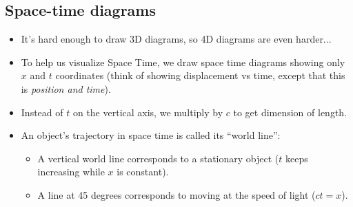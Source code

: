 \documentclass[aspectratio=169,
hyperref={colorlinks,urlcolor=blue}
]{beamer}
\begin{document}
\subsection{Space-time diagrams}
{
\begin{itemize}
\item It’s hard enough to draw 3D diagrams, so 4D diagrams are even harder...
\item To help us visualize Space Time, we draw space time diagrams showing only $x$ and $t$ coordinates (think of showing displacement vs time, except that this is \emph{position and time}).
\item Instead of $t$ on the vertical axis, we multiply by $c$ to get dimension of length.
\item An object's trajectory in space time is called its ``world line'':
\begin{itemize}
\item A vertical world line corresponds to a stationary object ($t$ keeps increasing while $x$ is constant).
\item A line at 45 degrees corresponds to moving at the speed of light ($ct = x$).
\end{itemize}

\end{itemize}
}
{
\centering
{}
}



\end{document}
